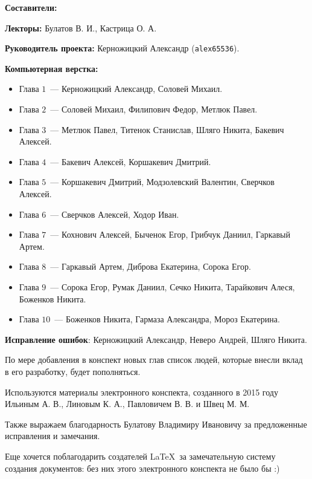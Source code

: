 \documentclass[../main.tex]{subfiles}
\begin{document}
{\Huge \bf Составители:}

\vspace{2em}

{
    \textbf{Лекторы:} Булатов В. И., Кастрица О. А.
    
    \smallskip
    
    \textbf{Руководитель проекта:} Керножицкий Александр 
    (\texttt{alex65536}).
    
    \smallskip
    
    \textbf{Компьютерная верстка:}
    \begin{itemize}
     \item Глава $1$~--- Керножицкий Александр, Соловей Михаил.
     \item Глава $2$~--- Соловей Михаил, Филипович Федор, Метлюк 
     Павел.
     \item Глава $3$~--- Метлюк Павел, Титенок Станислав, Шляго 
     Никита, Бакевич Алексей.
     \item Глава $4$~--- Бакевич Алексей, Коршакевич Дмитрий.
     \item Глава $5$~--- Коршакевич Дмитрий, Модзолевский 
     Валентин, Сверчков Алексей.
     \item Глава $6$~--- Сверчков Алексей, Ходор Иван.
     \item Глава $7$~--- Кохнович Алексей, Быченок Егор, Грибчук Даниил,
     Гаркавый Артем.
     \item Глава $8$~--- Гаркавый Артем, Диброва Екатерина, Сорока Егор.
     \item Глава $9$~--- Сорока Егор, Румак Даниил, Сечко Никита, Тарайкович 
     Алеся, Боженков Никита.
     \item Глава $10$~--- Боженков Никита, Гармаза Александра, Мороз
     Екатерина.
    \end{itemize}
    
    \textbf{Исправление ошибок}: Керножицкий Александр, Неверо 
    Андрей, Шляго Никита.
    
    \medskip
    
    По мере добавления в конспект новых глав список людей, которые 
    внесли вклад в его разработку, будет пополняться.
    
    \vspace{1.5em}
    
    Используются материалы электронного конспекта, созданного в 
    2015 году Ильиным А. В., Линовым К. А., Павловичем В. В. и 
    Швец М. М.

    \smallskip
    
    Также выражаем благодарность Булатову Владимиру Ивановичу за 
    предложенные исправления и замечания.
    
    \smallskip
    
    Еще хочется поблагодарить создателей \LaTeX\ за замечательную 
    систему создания документов: без них этого электронного 
    конспекта не было бы :)
}

\pagebreak
\end{document}
